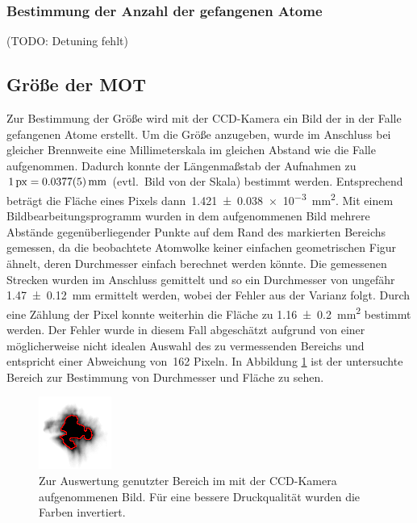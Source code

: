 \documentclass[11pt, a4paper]{article}
\numberwithin{equation}{section}
\newcommand{\korr}[1]{{\color{red}(#1)}}
\begin{document}
\subsubsection{Bestimmung der Anzahl der gefangenen Atome}
\label{sec:atomzahl}
\korr{TODO: Detuning fehlt}



\subsection{Größe der MOT}
Zur Bestimmung der Größe wird mit der CCD-Kamera ein Bild der in der Falle gefangenen Atome erstellt.
Um die Größe anzugeben, wurde im Anschluss bei gleicher Brennweite eine Millimeterskala im gleichen Abstand wie die Falle aufgenommen.
Dadurch konnte der Längenmaßstab der Aufnahmen zu~$\SI{1}{px}=\SI{0,0377+-0,0005}{mm}$ \korr{evtl.\ Bild von der Skala} bestimmt werden.
Entsprechend beträgt die Fläche eines Pixels dann~\SI{1.421+-0.038e-3}{mm^2}.
Mit einem Bildbearbeitungsprogramm wurden in dem aufgenommenen Bild mehrere Abstände gegenüberliegender Punkte auf dem Rand des markierten Bereichs gemessen, da die beobachtete Atomwolke keiner einfachen geometrischen Figur ähnelt, deren Durchmesser einfach berechnet werden könnte.
Die gemessenen Strecken wurden im Anschluss gemittelt und so ein Durchmesser von ungefähr \SI{1,47+-0,12}{mm} ermittelt werden, wobei der Fehler aus der Varianz folgt.
Durch eine Zählung der Pixel konnte weiterhin die Fläche zu \SI{1,16+-0,2}{mm^2} bestimmt werden.
Der Fehler wurde in diesem Fall abgeschätzt aufgrund von einer möglicherweise nicht idealen Auswahl des zu vermessenden Bereichs und entspricht einer Abweichung von~\num{162} Pixeln.
In Abbildung \ref{fig:mot_groesse} ist der untersuchte Bereich zur Bestimmung von Durchmesser und Fläche zu sehen.
\begin{figure}[h]
	\centering
	\includegraphics[width=.7\textwidth]{./figures/size_inverted.png}
	\caption{Zur Auswertung genutzter Bereich im mit der CCD-Kamera aufgenommenen Bild. Für eine bessere Druckqualität wurden die Farben invertiert.}
	\label{fig:mot_groesse}
\end{figure}
\end{document}

